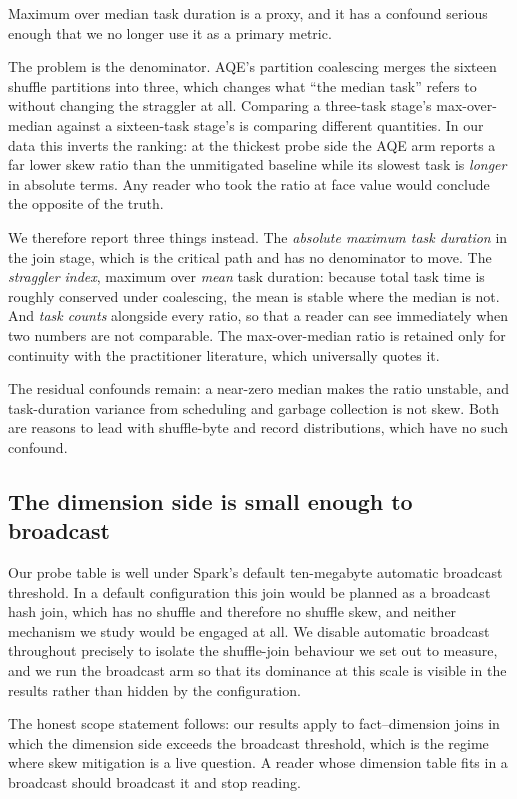 Maximum over median task duration is a proxy, and it has a confound serious
enough that we no longer use it as a primary metric.

The problem is the denominator. AQE's partition coalescing merges the sixteen
shuffle partitions into three, which changes what ``the median task'' refers to
without changing the straggler at all. Comparing a three-task stage's
max-over-median against a sixteen-task stage's is comparing different
quantities. In our data this inverts the ranking: at the thickest probe side
the AQE arm reports a far lower skew ratio than the unmitigated baseline while
its slowest task is \emph{longer} in absolute terms. Any reader who took the
ratio at face value would conclude the opposite of the truth.

We therefore report three things instead. The \emph{absolute maximum task
duration} in the join stage, which is the critical path and has no denominator
to move. The \emph{straggler index}, maximum over \emph{mean} task duration:
because total task time is roughly conserved under coalescing, the mean is
stable where the median is not. And \emph{task counts} alongside every ratio,
so that a reader can see immediately when two numbers are not comparable. The
max-over-median ratio is retained only for continuity with the practitioner
literature, which universally quotes it.

The residual confounds remain: a near-zero median makes the ratio unstable, and
task-duration variance from scheduling and garbage collection is not skew. Both
are reasons to lead with shuffle-byte and record distributions, which have no
such confound.

\subsection{The dimension side is small enough to broadcast}

Our probe table is well under Spark's default ten-megabyte automatic broadcast
threshold. In a default configuration this join would be planned as a broadcast
hash join, which has no shuffle and therefore no shuffle skew, and neither
mechanism we study would be engaged at all. We disable automatic broadcast
throughout precisely to isolate the shuffle-join behaviour we set out to
measure, and we run the broadcast arm so that its dominance at this scale is
visible in the results rather than hidden by the configuration.

The honest scope statement follows: our results apply to fact--dimension joins
in which the dimension side exceeds the broadcast threshold, which is the
regime where skew mitigation is a live question. A reader whose dimension table
fits in a broadcast should broadcast it and stop reading.

